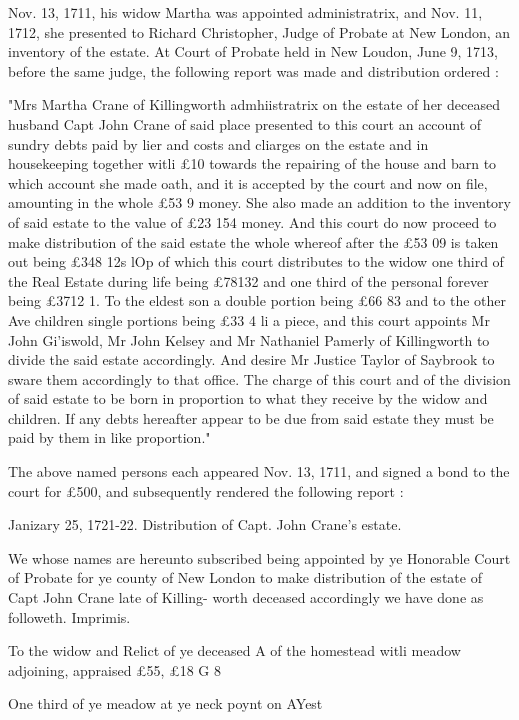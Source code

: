 \documentclass{book}
\begin{document}
Nov. 13, 1711, his widow Martha was appointed administratrix, 
and Nov. 11, 1712, she presented to Richard Christopher, Judge 
of Probate at New London, an inventory of the estate. At Court 
of Probate held in New Loudon, June 9, 1713, before the same 
judge, the following report was made and distribution ordered : 

"Mrs Martha Crane of Killingworth admhiistratrix on the estate of 
her deceased husband Capt John Crane of said place presented to this 
court an account of sundry debts paid by lier and costs and cliarges on 
the estate and in housekeeping together witli £10 towards the repairing 
of the house and barn to which account she made oath, and it is accepted 
by the court and now on file, amounting in the whole £53   9 money. 
She also made an addition to the inventory of said estate to the value of 
£23  154 money. And this court do now proceed to make distribution 
of the said estate the whole whereof after the £53  09 is taken out 
being £348  12s  lOp of which this court distributes to the widow one 
third of the Real Estate during life being £78132 and one third of the 
personal forever being £3712  1. To the eldest son a double portion 
being £66  83 and to the other Ave children single portions being 
£33 4 li a piece, and this court appoints Mr John Gi'iswold, Mr John 
Kelsey and Mr Nathaniel Pamerly of Killingworth to divide the said 
estate accordingly. And desire Mr Justice Taylor of Saybrook to sware 
them accordingly to that office. The charge of this court and of the 
division of said estate to be born in proportion to what they receive by 
the widow and children. If any debts hereafter appear to be due from 
said estate they must be paid by them in like proportion." 

The above named persons each appeared Nov. 13, 1711, and 
signed a bond to the court for £500, and subsequently rendered 
the following report : 

Janizary 25, 1721-22. Distribution of Capt. John Crane's 
estate. 

We whose names are hereunto subscribed being appointed by 
ye Honorable Court of Probate for ye county of New London to 
make distribution of the estate of Capt John Crane late of Killing- 
worth deceased accordingly we have done as followeth. 
Imprimis. 

To the widow and Relict of ye deceased A of the 
homestead witli meadow adjoining, appraised 
£55, £18 G 8 

One third of ye meadow at ye neck poynt on AYest 
\end{document}
